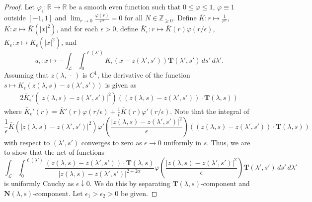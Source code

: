 \documentclass[reqno,centertags,12pt]{amsart}
\theoremstyle{definition}
\numberwithin{equation}{section}
\newcommand{\abs}[1]{\left\lvert#1\right\rvert}
\newcommand{\bbR}{{\mathbb{R}}}
\newcommand{\bbZ}{{\mathbb{Z}}}
\begin{document}
\begin{proof}
    Let $\varphi_{\epsilon}\colon\bbR\to\bbR$ be a smooth even function
    such that $0\leq\varphi\leq 1$, $\varphi\equiv 1$ outside $[-1,1]$
    and $\lim_{r\to 0}\frac{\varphi(r)}{r^{N}} = 0$ for all $N\in\bbZ_{\geq0}$.
    Define $\bar{K}\colon r\mapsto\frac{1}{r^{\alpha}}$,
    $K\colon x\mapsto \bar{K}\left(\abs{x}^{2}\right)$, and
    for each $\epsilon>0$, define
    $\bar{K}_{\epsilon}\colon r\mapsto \bar{K}(r)\varphi(r/\epsilon)$,
    $K_{\epsilon}\colon x\mapsto \bar{K}_{\epsilon}\left(\abs{x}^{2}\right)$, and
    \[
        u_{\epsilon}\colon x\mapsto -\int_{\mathcal{L}}\int_{0}^{\ell(\lambda')}
        K_{\epsilon}(x-z(\lambda',s'))\mathbf{T}(\lambda',s')
        \,ds'\,d\lambda'.
    \]
    Assuming that $z(\lambda,\,\cdot\,)$ is $C^{1}$, the derivative of the function
    $s\mapsto K_{\epsilon}(z(\lambda,s) - z(\lambda',s'))$ is given as
    \begin{align*}
        2\bar{K}_{\epsilon}'\left(\abs{z(\lambda,s) - z(\lambda',s')}^{2}\right)
        \left((z(\lambda,s) - z(\lambda',s'))\cdot\mathbf{T}(\lambda,s)\right)
    \end{align*}
    where $\bar{K}_{\epsilon}'(r) = \bar{K}'(r)\varphi(r/\epsilon)
    + \frac{1}{\epsilon}\bar{K}(r)\varphi'(r/\epsilon)$. Note that the integral of
    \[
        \frac{1}{\epsilon}
        \bar{K}\left(\abs{z(\lambda,s)-z(\lambda',s')}^{2}\right)
        \varphi'\left(\frac{\abs{z(\lambda,s)-z(\lambda',s')}^{2}}{\epsilon}\right)
        \left((z(\lambda,s) - z(\lambda',s'))\cdot\mathbf{T}(\lambda,s)\right)
    \]
    with respect to $(\lambda',s')$ converges to zero as $\epsilon\to 0$ uniformly in $s$.
    Thus, we are to show that the net of functions
    \[
        \int_{\mathcal{L}}\int_{0}^{\ell(\lambda')}
        \frac{(z(\lambda,s)-z(\lambda',s'))\cdot\mathbf{T}(\lambda,s)}
        {\abs{z(\lambda,s)-z(\lambda',s')}^{2+2\alpha}}
        \varphi\left(\frac{\abs{z(\lambda,s)-z(\lambda',s')}^{2}}{\epsilon}\right)
        \mathbf{T}(\lambda',s')\,ds'\,d\lambda'
    \]
    is uniformly Cauchy as $\epsilon\downarrow 0$.
    We do this by separating $\mathbf{T}(\lambda,s)$-component and
    $\mathbf{N}(\lambda,s)$-component. Let $\epsilon_{1}>\epsilon_{2}>0$ be given.


\end{proof}
\end{document}
